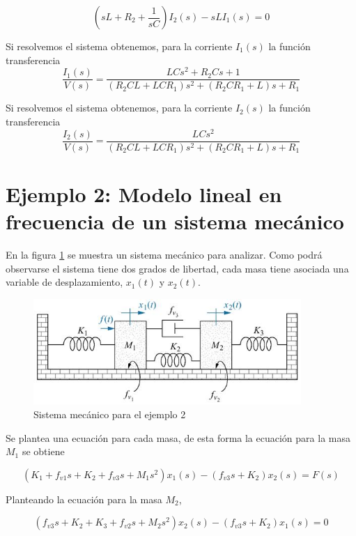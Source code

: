 \documentclass[12pt]{book}
\theoremstyle{definition}
\theoremstyle{remark}
\theoremstyle{plain}
\begin{document}
\begin{equation}
\label{equ307}
(s L + R_2+ \frac{1}{s C}) I_2(s)-s L I_1(s)=0
\end{equation}

Si resolvemos el sistema obtenemos, para la corriente $I_1(s)$ la función transferencia
\begin{equation}
\label{equ308}
\frac{I_1(s)}{V(s)}=\frac{L C s^2 + R_2 C s+1}{(R_2 C L + L C R_1) s^2+(R_2 C R_1 +L)s+R_1}
\end{equation}

Si resolvemos el sistema obtenemos, para la corriente $I_2(s)$ la función transferencia
\begin{equation}
\label{equ309}
\frac{I_2(s)}{V(s)}=\frac{L C s^2 }{(R_2 C L + L C R_1) s^2+(R_2 C R_1 +L)s+R_1}
\end{equation}

\section{Ejemplo 2: Modelo lineal en frecuencia de un sistema mecánico}
En la figura \ref{fig305} se muestra un sistema mecánico para analizar. Como podrá observarse el sistema tiene dos grados de libertad, cada masa tiene asociada una variable de desplazamiento, $x_1(t)$ y $x_2(t)$.
\begin{figure}
\centering
\includegraphics[width=4in]{sistemamecanico1.jpg}
\caption{Sistema mecánico para el ejemplo 2}
\label{fig305}
\end{figure}

Se plantea una ecuación para cada masa, de esta forma la ecuación para la masa $M_1$ se obtiene

\begin{equation}
\label{equ310}
(K_1+f_{v1}s+K_2+f_{v3}s+M_1 s^2) x_1(s)-(f_{v3}s+K_2) x_2(s)= F(s)
\end{equation}

Planteando la ecuación para la masa $M_2$,

\begin{equation}
\label{equ311}
(f_{v3} s +K_2+K_3+f_{v2}s+M_2 s^2) x_2(s)-(f_{v3}s+K_2) x_1(s)=0
\end{equation}
\end{document}

